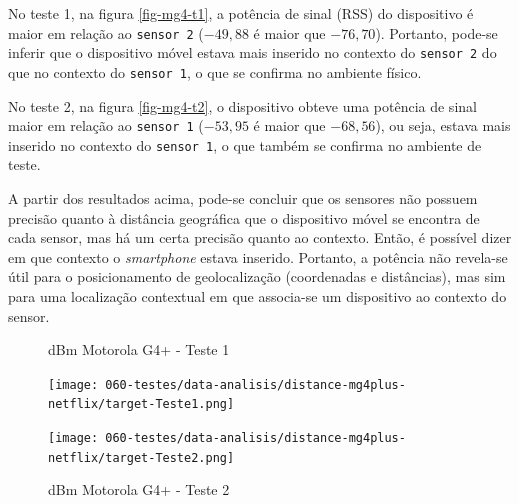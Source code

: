 No teste 1, na figura \autoref{fig-mg4-t1}, a potência de sinal (RSS) do dispositivo é maior em relação ao
\texttt{sensor 2} ($-49,88$ é maior que $-76,70$). Portanto, pode-se inferir que o
dispositivo móvel estava mais inserido no contexto do \texttt{sensor 2} do que no contexto
do \texttt{sensor 1}, o que se confirma no ambiente físico.

No teste 2, na figura \autoref{fig-mg4-t2}, o dispositivo obteve uma potência de sinal maior em relação ao
\texttt{sensor 1} ($-53,95$ é maior que $-68,56$), ou seja, estava mais inserido no contexto
do \texttt{sensor 1}, o que também se confirma no ambiente de teste.

A partir dos resultados acima, pode-se concluir que os sensores não possuem
precisão quanto à distância geográfica que o dispositivo móvel se encontra de
cada sensor, mas há um certa precisão quanto ao contexto. Então, é possível
dizer em que contexto o \emph{smartphone} estava inserido. Portanto,
a potência não revela-se útil para o posicionamento de geolocalização
(coordenadas e distâncias), mas sim para uma localização
contextual em que associa-se um dispositivo ao contexto do sensor.


\begin{figure}[htb]
	\label{mg4-distance}
	\centering
	\begin{minipage}{0.49\textwidth}
	\centering
		\caption{\label{fig-mg4-t1}dBm Motorola G4+ - Teste 1}
		\texttt{[image: 060-testes/data-analisis/distance-mg4plus-netflix/target-Teste1.png]}
	\end{minipage}
	\hfill
	\begin{minipage}{0.49\textwidth}
	\centering
		\caption{\label{fig-mg4-t2}dBm Motorola G4+ - Teste 2}
		\texttt{[image: 060-testes/data-analisis/distance-mg4plus-netflix/target-Teste2.png]}
	\end{minipage}
\end{figure}
